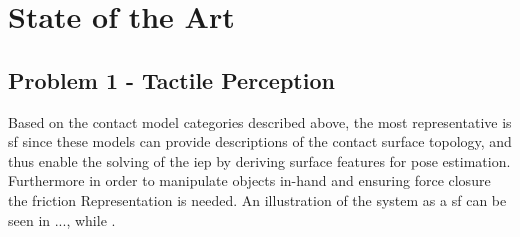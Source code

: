 \chapter{State of the Art} \label{ch:state-of-the-art}

\section{Problem 1 - Tactile Perception} \label{sec:lit-rev-problem-1}

Based on the contact model categories described above, the most representative is \gls{sf} since these models can provide descriptions of the contact surface topology, and thus enable the solving of the \gls{iep} by deriving surface features for pose estimation. Furthermore in order to manipulate objects in-hand and ensuring force closure the friction Representation is needed. An illustration of the system as a \gls{sf} can be seen in ..., while . 



